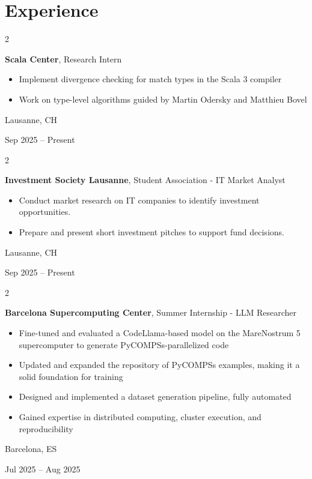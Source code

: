 \documentclass[10pt, letterpaper]{article}
\newenvironment{highlights}{
    \begin{itemize}[
        topsep=0.10 cm,
        parsep=0.10 cm,
        partopsep=0pt,
        itemsep=0pt,
        leftmargin=0.4 cm + 10pt
    ]
}{
    \end{itemize}
} %
\newenvironment{twocolentry}[2][]{
    \onecolentry
    \def\secondColumn{#2}
    \setcolumnwidth{\fill, 4.5 cm}
    \begin{paracol}{2}
}{
    \switchcolumn \raggedleft \secondColumn
    \end{paracol}
    \endonecolentry
} %
\begin{document}
    \section{Experience}

        \begin{twocolentry}{
            Lausanne, CH

            Sep 2025 – Present
        }
            \textbf{Scala Center}, Research Intern
            \begin{highlights}
                \item Implement divergence checking for match types in the Scala 3 compiler
                \item Work on type-level algorithms guided by Martin Odersky and Matthieu Bovel
            \end{highlights}
        \end{twocolentry}

        \begin{twocolentry}{
            Lausanne, CH

            Sep 2025 – Present
        }
            \textbf{Investment Society Lausanne}, Student Association - IT Market Analyst
            \begin{highlights}
                \item Conduct market research on IT companies to identify investment opportunities.
                \item Prepare and present short investment pitches to support fund decisions.
            \end{highlights}
        \end{twocolentry}

       \begin{twocolentry}{
            Barcelona, ES

            Jul 2025 – Aug 2025
        }
            \textbf{Barcelona Supercomputing Center}, Summer Internship - LLM Researcher
            \begin{highlights}
                \item Fine-tuned and evaluated a CodeLlama-based model on the MareNostrum 5 supercomputer to generate PyCOMPSs-parallelized code
                \item Updated and expanded the repository of PyCOMPSs examples, making it a solid foundation for training
                \item Designed and implemented a dataset generation pipeline, fully automated 
                \item Gained expertise in distributed computing, cluster execution, and reproducibility
            \end{highlights}
        \end{twocolentry}
\end{document}
